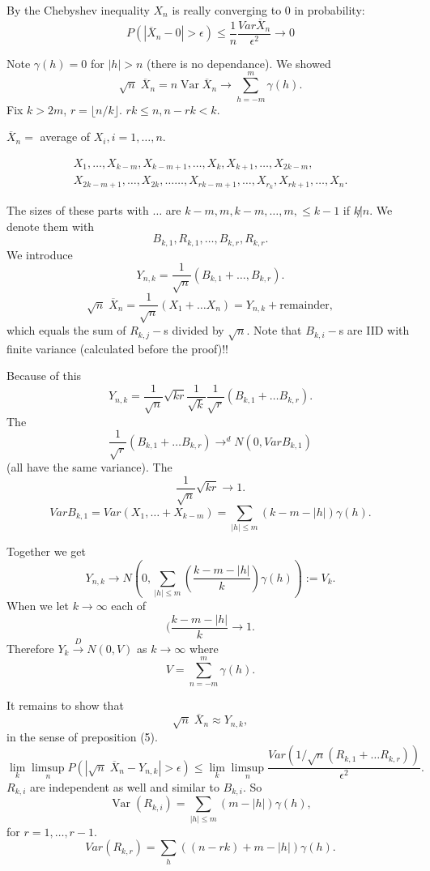 \documentclass[12pt,a4paper, notitlepage]{book}
\theoremstyle{definition} %
\theoremstyle{plain} %
\DeclareMathOperator{\Var}{Var}
\begin{document}
By the Chebyshev inequality $X_n$ is really converging to $0$ in probability: 
\[
 P(|\overline{X}_n - 0| > \epsilon ) \leq \frac{1}{n} \frac{Var \overline{X}_n}{\epsilon^2}   \rightarrow 0 
\]

\proof
Note $\gamma(h) = 0$ for $|h| > n$ (there is no dependance). We showed 
\[ \sqrt{n} \; \overline{X}_n = n \Var \overline{X}_n \rightarrow \sum_{h=-m}^m \gamma(h). \]
 Fix $k > 2m$, $r = \lfloor n/k \rfloor$. $r k \leq n, n - rk < k$. 

$\overline{X}_n = $ average of $X_i, i = 1,\dots,n$.

\begin{align*} X_1, \dots, X_{k-m}, X_{k-m+1}, \dots, X_{k}, X_{k+1}, \dots, X_{2k-m}, \\
 X_{2k-m+1},\dots,X_{2k}, \dots \dots, X_{rk-m+1}, \dots, X_{r_k}, X_{rk+1},\dots,X_{n}. \end{align*}

 The sizes of these parts with $\dots$ are $k-m, m, k-m, \dots, m, \leq k-1$ if $ k \not | n$. 
We denote them with 
\[ B_{k,1}, R_{k,1}, \dots, B_{k, r}, R_{k, r}. \]
 We introduce 
\[ Y_{n,k} = \frac{1}{\sqrt{n}} (B_{k, 1} + \dots, B_{k,r}). \]
 \[ \sqrt{n} \; \overline{X}_n = \frac{1}{\sqrt{n}} (X_1 + \dots X_n) = Y_{n, k} +  \text{remainder} , \]
 which equals the sum of $R_{k,j}-$s divided by $\sqrt{n}$. Note that $B_{k,i}-$s are IID with finite 
variance (calculated before the proof)!! 

Because of this 
\[ Y_{n,k} = \frac{1}{\sqrt{n}} \sqrt{kr} \frac{1}{\sqrt{k}} \frac{1}{\sqrt{r}} (B_{k,1} + \dots B_{k,r}). \]
 The 
\[  \frac{1}{\sqrt{r}} (B_{k,1} + \dots B_{k,r}) \rightarrow^d N(0, Var B_{k,1}) \] (all have the same variance). The 
\[ \frac{1}{\sqrt{n}} \sqrt{kr} \rightarrow 1. \] 
\[ Var B_{k,1} = Var(X_1, \dots + X_{k-m}) = \sum_{|h| \leq m}(k-m-|h|)\gamma(h) . \]

Together we get 
\[ Y_{n,k} \rightarrow N(0, \sum_{|h| \leq m}(\frac{k-m-|h|}{k})\gamma(h)) := V_k. \]
 When we let $k \rightarrow \infty$ each of 
\[ (\frac{k-m-|h|}{k} \rightarrow 1. \]
 Therefore 
$ Y_k \overset{D}{\rightarrow} N(0, V)$ as $k \rightarrow \infty$ where 
\[ V = \sum_{n = -m}^m \gamma(h). \] 

It remains to show that 
\[ \sqrt{n}\; \overline{X}_n \approx Y_{n,k} , \]
 in the sense of preposition (5). 
\[ \lim_k \limsup_n P(|\sqrt{n}\; \overline{X}_n - Y_{n, k}| > \epsilon) \leq \lim_k \limsup_n \frac{Var(1/\sqrt{n}(R_{k,1} + \dots R_{k,r}))}{\epsilon^2} . \]
 $R_{k,i}$ are independent as well and similar to $B_{k,i}$. So 
\[ \Var(R_{k,i}) = \sum_{|h| \leq m}(m- |h|)\gamma(h) , \]
 for $r = 1, \dots, r-1$. 
\[ Var(R_{k,r}) = \sum_h ((n -rk) + m - |h|)\gamma(h). \]
\end{document}

